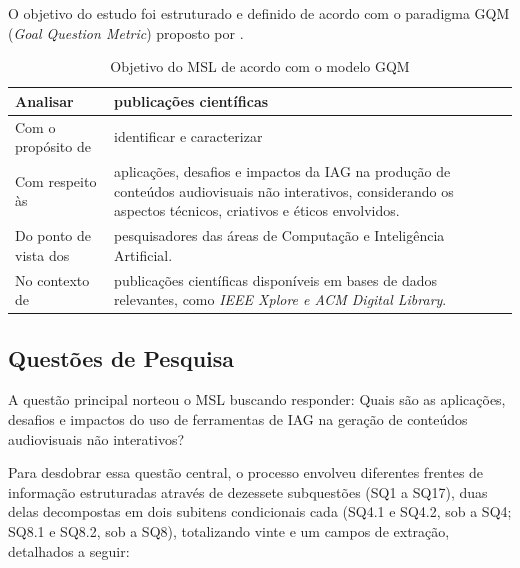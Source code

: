 O objetivo do estudo foi estruturado e definido de acordo com o paradigma GQM (\textit{Goal Question Metric}) proposto por \citet{basili1988tame}.

\begin{longtable}{|p{4cm}|p{11cm}|}
\caption  {Objetivo do MSL de acordo com o modelo GQM}
\label{tab:objetivo}
\\
\hline
Analisar & publicações científicas\\
\hline
Com o propósito de & identificar e caracterizar  \\
\hline
Com respeito às & aplicações, desafios e impactos da IAG na produção de conteúdos audiovisuais não interativos, considerando os aspectos técnicos, criativos e éticos envolvidos.  \\
\hline
Do ponto de vista dos & pesquisadores das áreas de Computação e Inteligência Artificial.  \\
\hline
No contexto de& publicações científicas disponíveis em bases de dados relevantes, como \textit{IEEE Xplore e ACM Digital Library}. \\
\hline
\end{longtable}

\subsection{Questões de Pesquisa}

A questão principal norteou o MSL buscando responder: Quais são as aplicações, desafios e impactos do uso de ferramentas de IAG na geração de conteúdos audiovisuais não interativos?

Para desdobrar essa questão central, o processo envolveu diferentes frentes de informação estruturadas através de dezessete subquestões (SQ1 a SQ17), duas delas decompostas em dois subitens condicionais cada (SQ4.1 e SQ4.2, sob a SQ4; SQ8.1 e SQ8.2, sob a SQ8), totalizando vinte e um campos de extração, detalhados a seguir:

